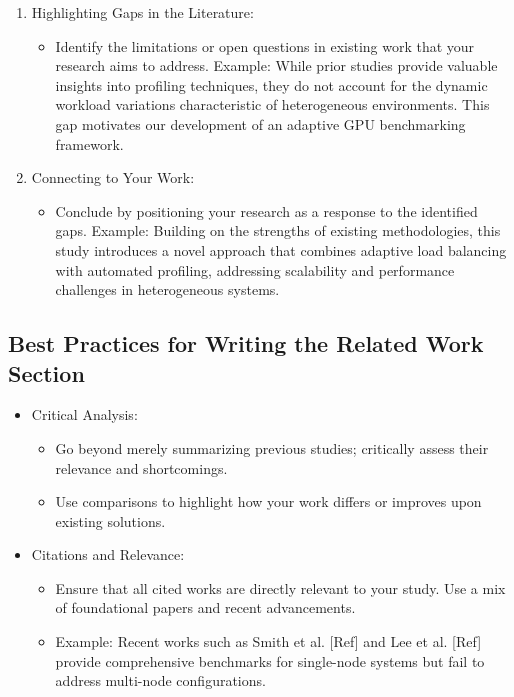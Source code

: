 \documentclass[conference]{IEEEtran}
\begin{document}
\begin{enumerate}
\item Highlighting Gaps in the Literature:  
\begin{itemize}
   \item Identify the limitations or open questions in existing work that your research aims to address. Example: While prior studies provide valuable insights into profiling techniques, they do not account for the dynamic workload variations characteristic of heterogeneous environments. This gap motivates our development of an adaptive GPU benchmarking framework.  
\end{itemize}

\item Connecting to Your Work:  
\begin{itemize}
   \item Conclude by positioning your research as a response to the identified gaps. Example: Building on the strengths of existing methodologies, this study introduces a novel approach that combines adaptive load balancing with automated profiling, addressing scalability and performance challenges in heterogeneous systems. 
\end{itemize}
\end{enumerate}

\subsection{Best Practices for Writing the Related Work Section}
\begin{itemize}
\item Critical Analysis:  
\begin{itemize}
   \item Go beyond merely summarizing previous studies; critically assess their relevance and shortcomings.  
   \item Use comparisons to highlight how your work differs or improves upon existing solutions.  
\end{itemize}
\end{itemize}

\begin{itemize}
\item Citations and Relevance:  
\begin{itemize}
   \item Ensure that all cited works are directly relevant to your study. Use a mix of foundational papers and recent advancements.  
   \item Example: Recent works such as Smith et al. [Ref] and Lee et al. [Ref] provide comprehensive benchmarks for single-node systems but fail to address multi-node configurations.  
\end{itemize}
\end{itemize}
\end{document}
